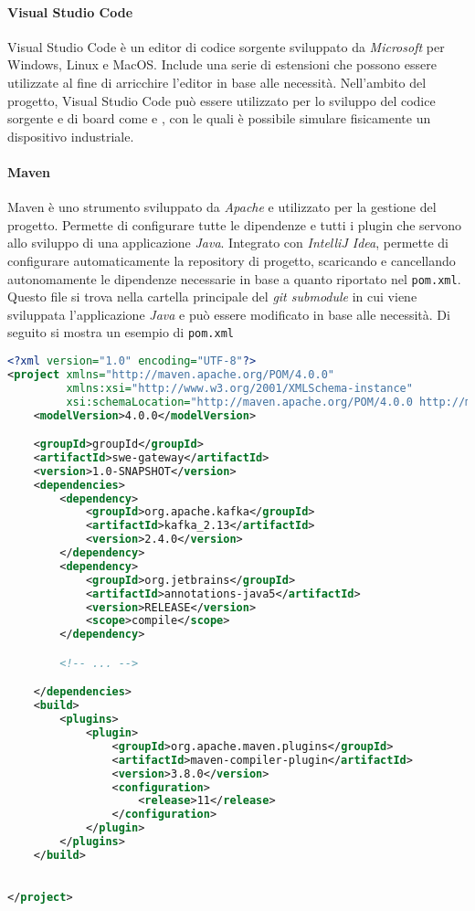 				\paragraph{Visual Studio Code} 
					Visual Studio Code è un editor di codice sorgente sviluppato da \textit{Microsoft} per Windows, Linux e MacOS. Include una serie di estensioni che possono essere utilizzate al fine di arricchire l'editor in base alle necessità. Nell'ambito del progetto, Visual Studio Code può essere utilizzato per lo sviluppo del codice sorgente e di board come  e , con le quali è possibile simulare fisicamente un dispositivo industriale.
				
				\paragraph{Maven}
					Maven è uno strumento sviluppato da \textit{Apache} e utilizzato per la gestione del progetto. Permette di configurare tutte le dipendenze e tutti i plugin che servono allo sviluppo di una applicazione \textit{Java}. Integrato con \textit{IntelliJ Idea}, permette di configurare automaticamente la repository di progetto, scaricando e cancellando autonomamente le dipendenze necessarie in base a quanto riportato nel \verb!pom.xml!. Questo file si trova nella cartella principale del \textit{git submodule} in cui viene sviluppata l'applicazione \textit{Java} e può essere modificato in base alle necessità. Di seguito si mostra un esempio di \verb!pom.xml!


					\begin{lstlisting}[language=xml]
<?xml version="1.0" encoding="UTF-8"?>
<project xmlns="http://maven.apache.org/POM/4.0.0"
         xmlns:xsi="http://www.w3.org/2001/XMLSchema-instance"
         xsi:schemaLocation="http://maven.apache.org/POM/4.0.0 http://maven.apache.org/xsd/maven-4.0.0.xsd">
    <modelVersion>4.0.0</modelVersion>

    <groupId>groupId</groupId>
    <artifactId>swe-gateway</artifactId>
    <version>1.0-SNAPSHOT</version>
    <dependencies>
        <dependency>
            <groupId>org.apache.kafka</groupId>
            <artifactId>kafka_2.13</artifactId>
            <version>2.4.0</version>
        </dependency>
        <dependency>
            <groupId>org.jetbrains</groupId>
            <artifactId>annotations-java5</artifactId>
            <version>RELEASE</version>
            <scope>compile</scope>
        </dependency>

        <!-- ... -->

    </dependencies>
    <build>
        <plugins>
            <plugin>
                <groupId>org.apache.maven.plugins</groupId>
                <artifactId>maven-compiler-plugin</artifactId>
                <version>3.8.0</version>
                <configuration>
                    <release>11</release>
                </configuration>
            </plugin>
        </plugins>
    </build>

    
</project>\end{lstlisting}


